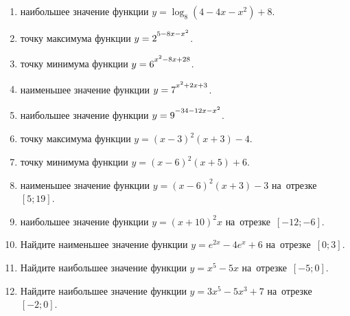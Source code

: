 \documentclass[a4paper,10pt]{article}
\begin{document}
\begin{enumerate}
\item {} наибольшее значение функции $y=\log_8\left(4-4x-x^2\right)+8$.

\item {} точку максимума функции $y=2\strut^{5-8x-x^2}$.

\item {} точку минимума функции $y=6\strut^{x^2-8x+28}$.

\item {} наименьшее значение функции $y=7\strut^{x^2+2x+3}$.

\item {} наибольшее значение функции $y=9\strut^{-34-12x-x^2}$.

\item {} точку максимума функции $y=\left(x-3\right)^2\left(x+3\right)-4$.

\item {} точку минимума функции $y=\left(x-6\right)^2\left(x+5\right)+6$.

\item {} наименьшее значение функции $y=\left(x-6\right)^2\left(x+3\right)-3$ на~отрезке~$\left[5;19\right]$.

\item {} наибольшее значение функции $y=\left(x+10\right)^2x$ на~отрезке~$\left[-12;-6\right]$.

\item Найдите наименьшее значение функции $y=e^{2x}-4e^x+6$ на~отрезке~$\left[0;3\right]$.

\item Найдите наибольшее значение функции $y=x^5-5x$ на~отрезке~$\left[-5;0\right]$.

\item Найдите наибольшее значение функции $y=3x^5-5x^3+7$ на~отрезке~$\left[-2;0\right]$.

\end{enumerate}
\end{document}
